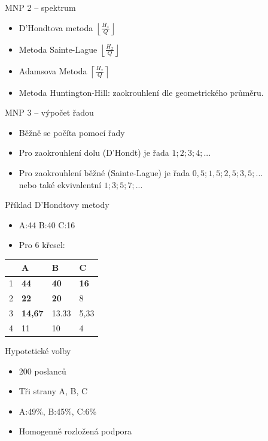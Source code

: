 \documentclass[17pt]{beamer}
\begin{document}
\begin{frame}{MNP 2 -- spektrum}
\begin{itemize}
\item D'Hondtova metoda $\left\lfloor\frac{H_{x}}{Q}\right\rfloor$
\item Metoda Sainte-Lague $\left\lfloor\frac{H_{x}}{Q}\right\rfloor$
\item Adamsova Metoda $\left\lceil\frac{H_{x}}{Q}\right\rceil$
\item Metoda Huntington-Hill: zaokrouhlení dle geometrického průměru.
\end{itemize}
\end{frame}

\begin{frame}{MNP 3 -- výpočet řadou}
\begin{itemize}
\item Běžně se počíta pomocí řady 
\item Pro zaokrouhlení dolu (D'Hondt) je řada $1; 2; 3; 4; ...$
\item Pro zaokrouhlení běžné (Sainte-Lague) je řada $0{,}5; 1{,}5; 2{,}5; 3{,}5; ...$
\\ nebo také ekvivalentní $1; 3; 5; 7; ...$
\end{itemize}
\end{frame}

\begin{frame}{Příklad D'Hondtovy metody}
\begin{itemize}
\item A:44 B:40 C:16
\item Pro 6 křesel:
\end{itemize}
\begin{center}
\begin{tabular}{|C{2cm}|C{2cm}|C{2cm}|C{2cm}|}
\hline 
 & A & B & C \\ 
 & \textbf{44} & \textbf{40} & \textbf{16} \\ 
 & \textbf{22} & \textbf{20} & 8 \\ 
 & \textbf{14,67} & 13.33 & 5,33 \\ 
 & 11 & 10 & 4 \\ 
\hline 
\end{tabular} 
\end{center}
\end{frame}

\begin{frame}{Hypotetické volby}
\begin{itemize}
\item 200 poslanců
\item Tři strany A, B, C
\item A:49\%, B:45\%, C:6\%
\item Homogenně rozložená podpora
\end{itemize}
\end{frame}
\end{document}
